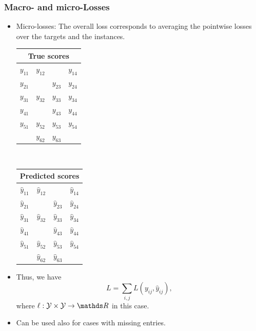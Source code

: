\documentclass[11pt,compress,t,notes=noshow, xcolor=table]{beamer}
\begin{document}
\begin{frame}
	\frametitle{Macro- and micro-Losses}
	
	\begin{itemize}
		\item<1-> Micro-losses: The overall loss corresponds to averaging the pointwise losses over the targets and the instances.
		
		\begin{center}
			\begin{tabular}{|c|c|c|c|}
				\multicolumn{4}{c}{True scores} \\
				\hline
				\color{putred}$y_{11}$ & \color{putred}$y_{12}$ &   & \color{putred}$y_{14}$ \\
				\color{putred}$y_{21}$ &   & \color{putred}$y_{23}$ & \color{putred}$y_{24}$ \\
				\color{putred}$y_{31}$ & \color{putred}$y_{32}$ & \color{putred}$y_{33}$ & \color{putred}$y_{34}$ \\
				\color{putred}$y_{41}$ &   & \color{putred}$y_{43}$ & \color{putred}$y_{44}$ \\
				\color{putred}$y_{51}$ & \color{putred}$y_{52}$ & \color{putred}$y_{53}$ & \color{putred}$y_{54}$ \\
				& \color{putred}$y_{62}$ & \color{putred}$y_{63}$ &   \\
				\hline
			\end{tabular}
			$\quad$
			\begin{tabular}{|c|c|c|c|}
				\multicolumn{4}{c}{Predicted scores} \\
				\hline
				\color{putred}$\hat{y}_{11}$ & \color{putred}$\hat{y}_{12}$ &   & \color{putred}$\hat{y}_{14}$ \\
				\color{putred}$\hat{y}_{21}$ &   & \color{putred}$\hat{y}_{23}$ & \color{putred}$\hat{y}_{24}$ \\
				\color{putred}$\hat{y}_{31}$ & \color{putred}$\hat{y}_{32}$ & \color{putred}$\hat{y}_{33}$ & \color{putred}$\hat{y}_{34}$ \\
				\color{putred}$\hat{y}_{41}$ &   & \color{putred}$\hat{y}_{43}$ & \color{putred}$\hat{y}_{44}$ \\
				\color{putred}$\hat{y}_{51}$ & \color{putred}$\hat{y}_{52}$ & \color{putred}$\hat{y}_{53}$ & \color{putred}$\hat{y}_{54}$ \\
				& \color{putred}$\hat{y}_{62}$ & \color{putred}$\hat{y}_{63}$ &   \\
				\hline
			\end{tabular}
		\end{center}	
	\lz
	\item Thus, we have	
		$$
	L =  \sum_{i,j} L(y_{ij} , \hat{y}_{ij}),
	$$
	where $\ell: \Yspace \times \Yspace \to \R$ in this case.
%	
	\item 	
		Can be used also for cases with missing entries.
	\end{itemize}
 

	
\end{frame}
\end{document}
